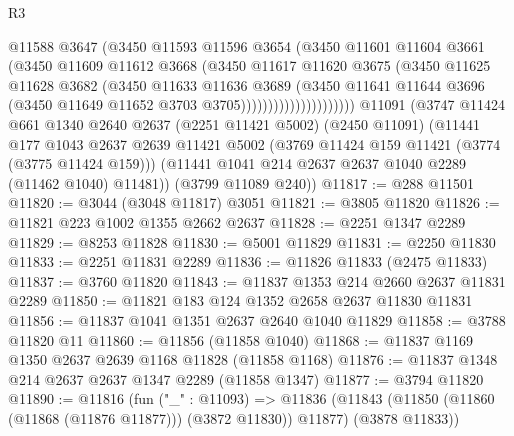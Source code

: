 \begin{lexlean}{R3}
\begin{coremodule}
                              @11588
                              @3647
                              (@3450
                                @11593
                                @11596
                                @3654
                                (@3450
                                  @11601
                                  @11604
                                  @3661
                                  (@3450
                                    @11609
                                    @11612
                                    @3668
                                    (@3450
                                      @11617
                                      @11620
                                      @3675
                                      (@3450
                                        @11625
                                        @11628
                                        @3682
                                        (@3450
                                          @11633
                                          @11636
                                          @3689
                                          (@3450
                                            @11641
                                            @11644
                                            @3696
                                            (@3450 @11649 @11652 @3703 @3705)))))))))))))))))))))
    @11091
    (@3747
      @11424
      @661
      @1340
      @2640
      @2637
      (@2251 @11421 @5002)
      (@2450 @11091)
      (@11441
        @177
        @1043
        @2637
        @2639
        @11421
        @5002
        (@3769 @11424 @159 @11421 (@3774 (@3775 @11424 @159)))
        (@11441 @1041 @214 @2637 @2637 @1040 @2289 (@11462 @1040) @11481))
      (@3799 @11089 @240))
@11817 := @288 @11501
@11820 := @3044 (@3048 @11817) @3051
@11821 := @3805 @11820
@11826 := @11821 @223 @1002 @1355 @2662 @2637
@11828 := @2251 @1347 @2289
@11829 := @8253 @11828
@11830 := @5001 @11829
@11831 := @2250 @11830
@11833 := @2251 @11831 @2289
@11836 := @11826 @11833 (@2475 @11833)
@11837 := @3760 @11820
@11843 := @11837 @1353 @214 @2660 @2637 @11831 @2289
@11850 := @11821 @183 @124 @1352 @2658 @2637 @11830 @11831
@11856 := @11837 @1041 @1351 @2637 @2640 @1040 @11829
@11858 := @3788 @11820 @11
@11860 := @11856 (@11858 @1040)
@11868 := @11837 @1169 @1350 @2637 @2639 @1168 @11828 (@11858 @1168)
@11876 := @11837 @1348 @214 @2637 @2637 @1347 @2289 (@11858 @1347)
@11877 := @3794 @11820
@11890 := @11816
    (fun ("_" : @11093) =>
    @11836 (@11843 (@11850 (@11860 (@11868 (@11876 @11877))) (@3872 @11830)) @11877) (@3878 @11833))

\end{coremodule}
\end{lexlean}
